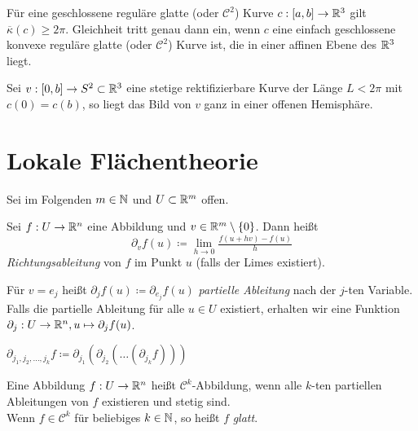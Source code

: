 \documentclass{cheat-sheet}
\newcommand{\Cont}{\mathcal{C}} %
\begin{document}
\begin{satz}
  Für eine geschlossene reguläre glatte (oder $\Cont^2$) Kurve $c : \left[ a, b \right] \to \mathbb{R}^3$ gilt $\overline\kappa(c) \geq 2 \pi$. Gleichheit tritt genau dann ein, wenn $c$ eine einfach geschlossene konvexe reguläre glatte (oder $\Cont^2$) Kurve ist, die in einer affinen Ebene des $\mathbb{R}^3$ liegt.
\end{satz}

\begin{samepage}

\begin{satz}
  Sei $v : \left[ 0, b \right] \to S^2 \subset \mathbb{R}^3$ eine stetige rektifizierbare Kurve der Länge $L < 2 \pi$
mit $c(0) = c(b)$, so liegt das Bild von $v$ ganz in einer offenen Hemisphäre.
\end{satz}


\section{Lokale Flächentheorie}


\end{samepage}

\begin{nota}
  Sei im Folgenden $m \in \mathbb{N}$ und $U \subset \mathbb{R}^m$ offen.
\end{nota}

\begin{defn}
  Sei $f : U \to \mathbb{R}^n$ eine Abbildung und $v \in \mathbb{R}^m \setminus \{ 0 \}$. Dann heißt
  \[ \partial_v f(u) \coloneqq \lim_{h \to 0} \tfrac{f(u + hv) - f(u)}{ h } \]
  \emph{Richtungsableitung} von $f$ im Punkt $u$ (falls der Limes existiert).
\end{defn}
\begin{defn}
  Für $v = e_j$ heißt $\partial_j f(u) \coloneqq \partial_{e_j} f(u)$ \emph{partielle Ableitung} nach der $j$-ten Variable. Falls die partielle Ableitung für alle $u \in U$ existiert, erhalten wir eine Funktion $\partial_j : U \to \mathbb{R}^n, u \mapsto \partial_j f(u)$.
\end{defn}

\begin{nota}
  $\partial_{j_1, j_2, \ldots, j_k} f \coloneqq \partial_{j_1} ( \partial_{j_2} ( \ldots ( \partial_{j_k} f) ) )$
\end{nota}

\begin{defn}
  Eine Abbildung $f : U \to \mathbb{R}^n$ heißt $\Cont^k$-Abbildung, wenn alle $k$-ten partiellen Ableitungen von $f$ existieren und stetig sind. \\
  Wenn $f \in \Cont^k$ für beliebiges $k \in \mathbb{N}$, so heißt $f$ \emph{glatt}.
\end{defn}
\end{document}
